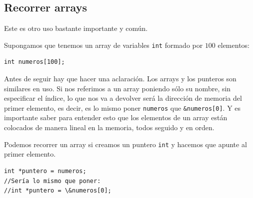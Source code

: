 \documentclass{fennix_cl}
\begin{document}
\subsection{Recorrer arrays}

Este es otro uso bastante importante y común.

Supongamos que tenemos un array de variables \texttt{int} formado por $100$ elementos:

\begin{lstlisting}
int numeros[100];
\end{lstlisting}

Antes de seguir hay que hacer una aclaración. Los arrays y los punteros son similares en uso. Si nos referimos a un array poniendo sólo su nombre, sin especificar el índice, lo que nos va a devolver será la dirección de memoria del primer elemento, es decir, es lo mismo poner \texttt{numeros} que \texttt{\&numeros[0]}. Y es importante saber para entender esto que los elementos de un array están colocados de manera lineal en la memoria, todos seguido y en orden.

Podemos recorrer un array si creamos un puntero \texttt{int} y hacemos que apunte al primer elemento.

\begin{lstlisting}
int *puntero = numeros;
//Sería lo mismo que poner:
//int *puntero = \&numeros[0];
\end{lstlisting}
\end{document}
